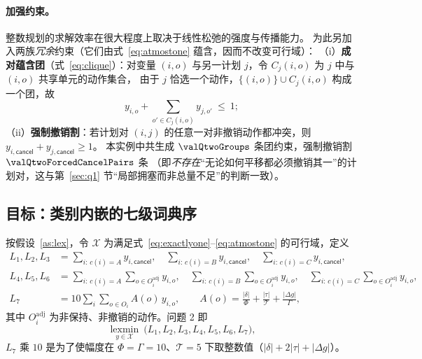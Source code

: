 \paragraph{加强约束。}整数规划的求解效率在很大程度上取决于线性松弛的强度与传播能力\cite{wolsey2020,achterberg2013}。
为此另加入两族\emph{冗余}约束（它们由式~\eqref{eq:atmostone} 蕴含，因而不改变可行域）：
（i）\textbf{成对蕴含团}（式~\eqref{eq:clique}）：对变量 $(i,o)$ 与另一计划 $j$，令 $C_j(i,o)$ 为 $j$ 中与 $(i,o)$ 共享单元的动作集合，
由于 $j$ 恰选一个动作，$\{(i,o)\}\cup C_j(i,o)$ 构成一个团，故
\begin{equation}\label{eq:clique}
  y_{i,o}+\sum_{o'\in C_j(i,o)} y_{j,o'}\ \le\ 1 ;
\end{equation}
（ii）\textbf{强制撤销割}：若计划对 $(i,j)$ 的任意一对非撤销动作都冲突，则 $y_{i,\textsf{cancel}}+y_{j,\textsf{cancel}}\ge 1$。
本实例中共生成 $\valQtwoGroups$ 条团约束，强制撤销割 $\valQtwoForcedCancelPairs$ 条
（即\emph{不存在}“无论如何平移都必须撤销其一”的计划对，这与第~\ref{sec:q1} 节“局部拥塞而非总量不足”的判断一致）。

\subsection{目标：类别内嵌的七级词典序}

按假设~\ref{as:lex}，令 $\mathcal{X}$ 为满足式~\eqref{eq:exactlyone}--\eqref{eq:atmostone} 的可行域，定义
\begin{equation}\label{eq:lex}
  \begin{aligned}
    L_1,L_2,L_3&=\sum_{i:\,c(i)=A}y_{i,\textsf{cancel}},\quad \sum_{i:\,c(i)=B}y_{i,\textsf{cancel}},\quad \sum_{i:\,c(i)=C}y_{i,\textsf{cancel}},\\
    L_4,L_5,L_6&=\sum_{i:\,c(i)=A}\sum_{o\in O_i^{\mathrm{adj}}}y_{i,o},\quad \sum_{i:\,c(i)=B}\sum_{o\in O_i^{\mathrm{adj}}}y_{i,o},\quad \sum_{i:\,c(i)=C}\sum_{o\in O_i^{\mathrm{adj}}}y_{i,o},\\
    L_7&=10\sum_{i}\sum_{o\in O_i}A(o)\,y_{i,o},\qquad A(o)=\frac{|\delta|}{\Phi}+\frac{|\tau|}{\mathcal{T}}+\frac{|\Delta g|}{\Gamma},
  \end{aligned}
\end{equation}
其中 $O_i^{\mathrm{adj}}$ 为非保持、非撤销的动作。问题 2 即
\begin{equation}\label{eq:lexmin}
  \operatorname*{lexmin}_{y\in\mathcal{X}}\ \bigl(L_1,L_2,L_3,L_4,L_5,L_6,L_7\bigr),
\end{equation}
$L_7$ 乘 $10$ 是为了使幅度在 $\Phi=\Gamma=10$、$\mathcal{T}=5$ 下取整数值（$|\delta|+2|\tau|+|\Delta g|$）。

